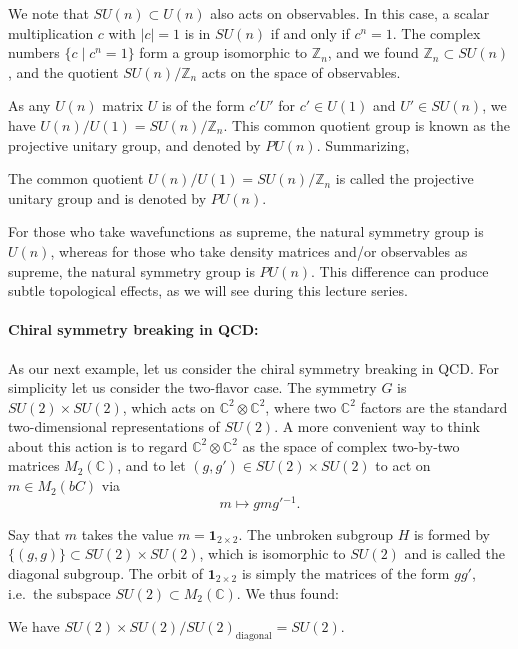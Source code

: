 \documentclass[12pt]{article}
\numberwithin{equation}{section}
\theoremstyle{remark}
\def\bC{\mathbb{C}}
\def\bZ{\mathbb{Z}}
\begin{document}
We note that $SU(n)\subset U(n)$ also acts on observables.
In this case, a scalar multiplication $c$ with $|c|=1$ is in $SU(n)$ if and only if $c^n=1$.
The complex numbers $\{c\mid c^n=1\}$ form a group isomorphic to $\bZ_n$,
and we found $\bZ_n \subset SU(n)$,
and the quotient $SU(n)/\bZ_n$ acts on the space of observables.

As any $U(n)$ matrix $U$ is of the form $c'U'$ for $c'\in U(1)$ and $U'\in SU(n)$,
we have $U(n)/U(1) = SU(n)/\bZ_n$.
This common quotient group is known as the projective unitary group, and denoted by $PU(n)$.
Summarizing, 
\begin{example}
The common quotient $U(n)/U(1)=SU(n)/\bZ_n$ is called the projective unitary group and is denoted by $PU(n)$.
\end{example}

For those who take wavefunctions as supreme, the natural symmetry group is $U(n)$,
whereas for those who take density matrices and/or observables as supreme,
the natural symmetry group is $PU(n)$.
This difference can produce subtle topological effects,
as we will see during this lecture series.

\paragraph{Chiral symmetry breaking in QCD:}
As our next example, 
let us consider the chiral symmetry breaking in QCD.
For simplicity let us consider the two-flavor case.
The symmetry $G$ is $SU(2)\times SU(2)$,
which acts on $\bC^2 \otimes \bC^2$,
where two $\bC^2$ factors are the standard two-dimensional representations of $SU(2)$.
A more convenient way to think about this action
is to regard $\bC^2\otimes \bC^2$ as the space of 
complex two-by-two matrices $M_2(\bC)$,
and to let $(g,g')\in SU(2)\times SU(2)$ to act on $m\in M_2(bC)$
via \begin{equation}
m\mapsto g m g'{}^{-1}.
\end{equation}

Say that $m$ takes the value $m=\mathbf{1}_{2\times 2}$.
The unbroken subgroup $H$ is formed by 
$\{(g,g)\}\subset SU(2)\times SU(2)$,
which is isomorphic to $SU(2)$ and is called the diagonal subgroup.
The orbit of $\mathbf{1}_{2\times 2}$ is simply 
the matrices of the form $gg'$,
i.e.~the subspace $SU(2)\subset M_2(\bC)$.
We thus found:
\begin{proposition}
We have $SU(2)\times SU(2)/SU(2)_\text{diagonal} = SU(2)$.
\end{proposition}
\end{document}
